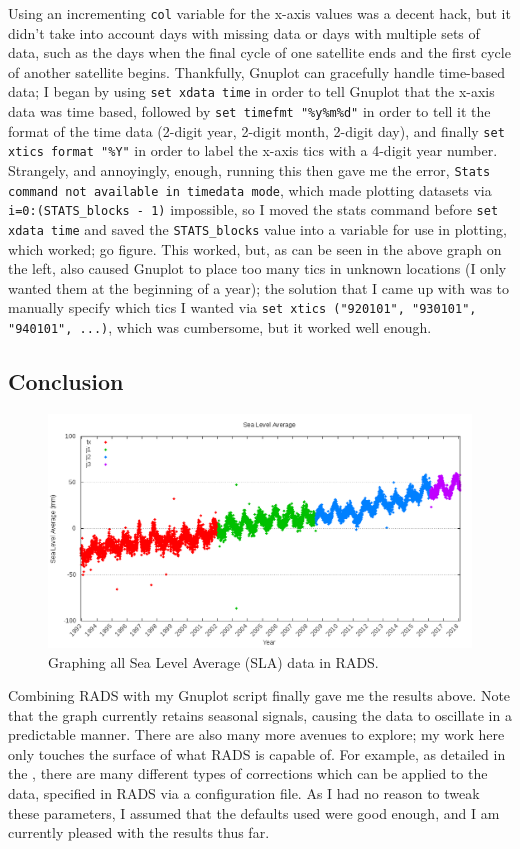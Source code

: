 \documentclass{article}
\begin{document}
Using an incrementing \texttt{col} variable for the x-axis values was a decent hack, but it didn't take into account days with missing data or days with multiple sets of data, such as the days when the final cycle of one satellite ends and the first cycle of another satellite begins.  Thankfully, Gnuplot can gracefully handle time-based data; I began by using \texttt{set xdata time} in order to tell Gnuplot that the x-axis data was time based, followed by \texttt{set timefmt "\%y\%m\%d"} in order to tell it the format of the time data (2-digit year, 2-digit month, 2-digit day), and finally \texttt{set xtics format "\%Y"} in order to label the x-axis tics with a 4-digit year number.  Strangely, and annoyingly, enough, running this then gave me the error, \texttt{Stats command not available in timedata mode}, which made plotting datasets via \texttt{i=0:(STATS_blocks - 1)} impossible, so I moved the stats command before \texttt{set xdata time} and saved the \texttt{STATS_blocks} value into a variable for use in plotting, which worked; go figure.  This worked, but, as can be seen in the above graph on the left, also caused Gnuplot to place too many tics in unknown locations (I only wanted them at the beginning of a year); the solution that I came up with was to manually specify which tics I wanted via \texttt{set xtics ("920101", "930101", "940101", ...)}, which was cumbersome, but it worked well enough.

\subsection{Conclusion}
\begin{figure}
\includegraphics{files/blog/2018_06_02_measuring_sea_level_averages_using_rads/2018_06_02_final.png}
\caption{Graphing all Sea Level Average (SLA) data in RADS.}
\end{figure}
Combining RADS with my Gnuplot script finally gave me the results above.  Note that the graph currently retains seasonal signals, causing the data to oscillate in a predictable manner.  There are also many more avenues to explore; my work here only touches the surface of what RADS is capable of.  For example, as detailed in the , there are many different types of corrections which can be applied to the data, specified in RADS via a configuration file.  As I had no reason to tweak these parameters, I assumed that the defaults used were good enough, and I am currently pleased with the results thus far.
\end{document}
